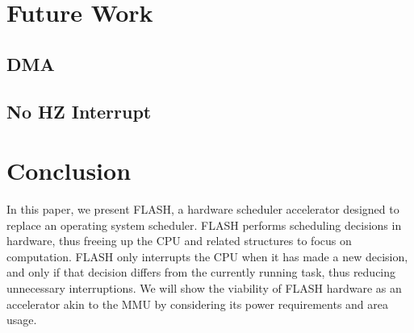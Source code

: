 \documentclass{sig-alternate-10pt}
\begin{document}
\section{Future Work}
\label{sec:future}
\subsection{DMA}
\subsection{No HZ Interrupt}

\section{Conclusion}
\label{sec:conclusion}
In this paper, we present FLASH, a hardware scheduler accelerator designed to replace an operating system scheduler. FLASH performs scheduling decisions in hardware, thus freeing up the CPU and related structures to focus on computation. FLASH only interrupts the CPU when it has made a new decision, and only if that decision differs from the currently running task, thus reducing unnecessary interruptions. We will show the viability of FLASH hardware as an accelerator akin to the MMU by considering its power requirements and area usage.

\nocite{*}
{
	
	
}
\end{document}
